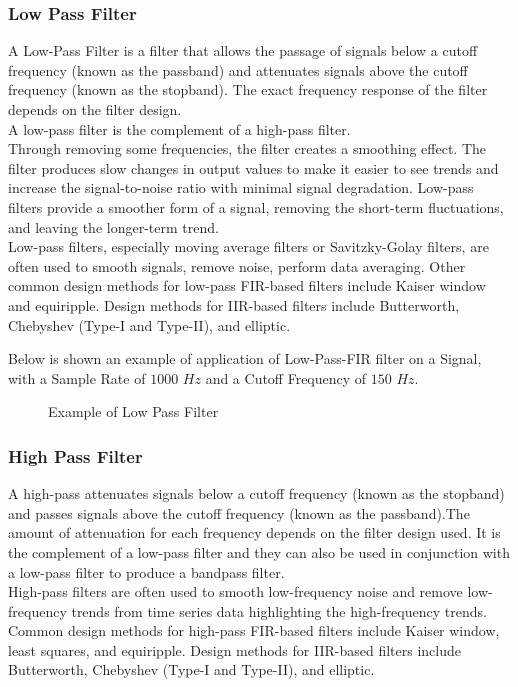 \documentclass[tesi]{subfiles}
\begin{document}
\subsubsection{Low Pass Filter} \label{ssc:Low Pass Filter}
A Low-Pass Filter is a filter that allows the passage of signals below a cutoff frequency (known as the passband) and attenuates signals above the cutoff frequency (known as the stopband). The exact frequency response of the filter depends on the filter design.\\A low-pass filter is the complement of a high-pass filter.\\
Through removing some frequencies, the filter creates a smoothing effect. The filter produces slow changes in output values to make it easier to see trends and increase the signal-to-noise ratio with minimal signal degradation.
Low-pass filters provide a smoother form of a signal, removing the short-term fluctuations, and leaving the longer-term trend.\\
Low-pass filters, especially moving average filters or Savitzky-Golay filters, are often used to smooth signals, remove noise, perform data averaging.
Other common design methods for low-pass FIR-based filters include Kaiser window and equiripple.  
Design methods for IIR-based filters include Butterworth, Chebyshev (Type-I and Type-II), and elliptic.

\noindent Below is shown an example of application of Low-Pass-FIR filter on a Signal, with a Sample Rate of $1000$ $Hz$ and a Cutoff Frequency of $150$ $Hz$.

 
\begin{figure}[H]	

\label{fig:NoFilter}



 \caption{Example of Low Pass Filter}
  \label{fig:Example of Low Pass Filter.}
\end{figure}

\subsubsection{High Pass Filter} \label{ssc:High Pass Filter}
A high-pass attenuates signals below a cutoff frequency (known as the stopband) and passes signals above the cutoff frequency (known as the passband).The amount of attenuation for each frequency depends on the filter design used.  It is the complement of a low-pass filter and they can also be used in conjunction with a low-pass filter to produce a bandpass filter.\\
\noindent High-pass filters are often used to smooth low-frequency noise and remove low-frequency trends from time series data highlighting the high-frequency trends.\\
\noindent Common design methods for high-pass FIR-based filters include Kaiser window, least squares, and equiripple. Design methods for IIR-based filters include Butterworth, Chebyshev (Type-I and Type-II), and elliptic.\\
\end{document}

